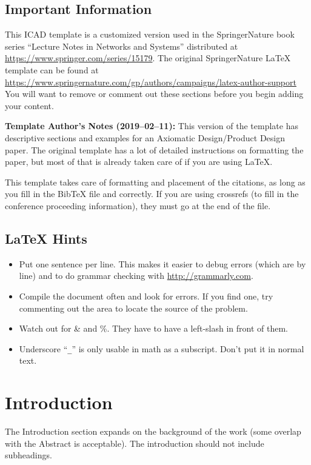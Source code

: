 \documentclass[sn-mathphys]{sn-jnl}%
\theoremstyle{thmstyleone}%
\theoremstyle{thmstyletwo}%
\theoremstyle{thmstylethree}%
\begin{document}
\subsection*{Important Information}\label{sec:important-info}
This ICAD template is a customized version used in the SpringerNature book series ``Lecture Notes in Networks and Systems'' distributed at \url{https://www.springer.com/series/15179}.
The original SpringerNature \LaTeX{} template can be found at \url{https://www.springernature.com/gp/authors/campaigns/latex-author-support}
You will want to remove or comment out these sections before you begin adding your content.

\textbf{Template Author's Notes (2019--02--11):}
  This version of the template has descriptive sections and examples for an Axiomatic Design/Product Design paper.
  The original template has a lot of detailed instructions on formatting the paper, but most of that is already taken care of if you are using LaTeX.

  This template takes care of formatting and placement of the citations, as long as you fill in the BibTeX file  and  correctly.
  If you are using crossrefs (to fill in the conference proceeding information), they must go at the end of the  file.

\subsection*{\LaTeX{} Hints}\label{sec:latex-hints}
\begin{itemize}
\item Put one sentence per line.
  This makes it easier to debug errors (which are by line) and to do grammar checking with \url{http://grammarly.com}.
\item Compile the document often and look for errors.
  If you find one, try commenting out the area to locate the source of the problem.
\item Watch out for \& and \%.  They have to have a left-slash in front of them.
\item Underscore ``\verb|_|'' is only usable in math as a subscript.
  Don't put it in normal text.
\end{itemize}


\section{Introduction}\label{sec:introduction}
The Introduction section expands on the background of the work (some overlap with the Abstract is acceptable).
The introduction should not include subheadings.
\end{document}
